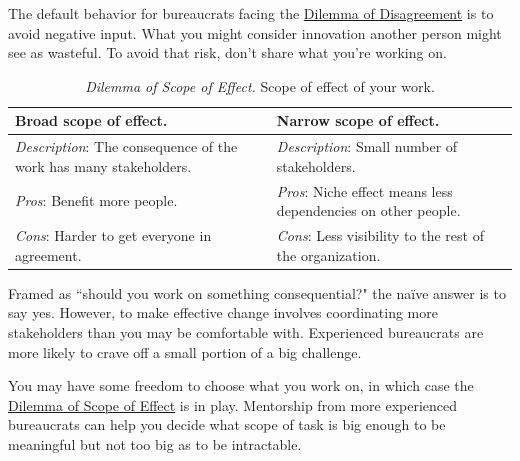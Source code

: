 %
The default behavior for bureaucrats facing the \hyperref[table:dilemma-personal-opposition-involve-ignore]{Dilemma of Disagreement} is to avoid negative input. What you might consider innovation another person might see as wasteful. To avoid that risk, don't share what you're working on.

\begin{center}
\begin{table}[H] %
\begin{tabular}{ | m{\dilemmatablewidth}| m{\dilemmatablewidth} | } 
  \hline
  \textbf{Broad scope of effect.} &
  \textbf{Narrow scope of effect.} \\
  \hline
  \textit{Description}: The consequence of the work has many stakeholders. &
  \textit{Description}: Small number of stakeholders. \\  
  \hline
  \textit{Pros}: Benefit more people. &
  \textit{Pros}: Niche effect means less dependencies on other people. \\
  \hline
  \textit{Cons}: Harder to get everyone in agreement. & 
  \textit{Cons}: Less visibility to the rest of the organization. \\
  \hline
\end{tabular}
\caption{
\textit{Dilemma of Scope of Effect.}
Scope of effect of your work. 
}
\label{table:dilemma-personal-scope-broad-vs-narrow}
\end{table}
\end{center}

Framed as ``should you work on something consequential?" the na\"ive answer is to say yes. However, to make effective change involves coordinating more stakeholders than you may be comfortable with. Experienced bureaucrats are more likely to crave off a small portion of a big challenge.

You may have some freedom to choose what you work on, in which case the \hyperref[table:dilemma-personal-scope-broad-vs-narrow]{Dilemma of Scope of Effect} is in play. Mentorship from more experienced bureaucrats can help you decide what scope of task is big enough to be meaningful but not too big as to be intractable.


